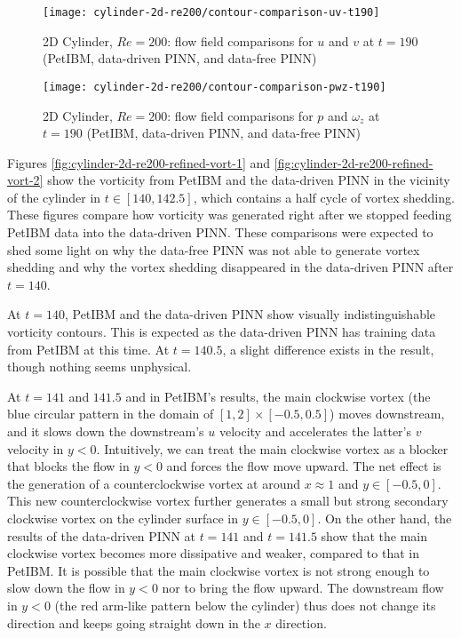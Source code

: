 \begin{figure}[hbt!]
    \texttt{[image: cylinder-2d-re200/contour-comparison-uv-t190]}
    \caption{2D Cylinder, $Re=200$: flow field comparisons for $u$ and $v$ at $t=190$ (PetIBM, data-driven PINN, and data-free PINN)}
    \label{fig:cylinder-re200-contour-uv-t190}
\end{figure}

\begin{figure}[hbt!]
    \texttt{[image: cylinder-2d-re200/contour-comparison-pwz-t190]}
    \caption{2D Cylinder, $Re=200$: flow field comparisons for $p$ and $\omega_z$ at $t=190$ (PetIBM, data-driven PINN, and data-free PINN)}
    \label{fig:cylinder-re200-contour-pwz-t190}
\end{figure}

\clearpage

Figures \ref{fig:cylinder-2d-re200-refined-vort-1} and \ref{fig:cylinder-2d-re200-refined-vort-2} show the vorticity from PetIBM and the data-driven PINN in the vicinity of the cylinder in $t \in [140, 142.5]$, which contains a half cycle of vortex shedding.
These figures compare how vorticity was generated right after we stopped feeding PetIBM data into the data-driven PINN.
These comparisons were expected to shed some light on why the data-free PINN was not able to generate vortex shedding and why the vortex shedding disappeared in the data-driven PINN after $t=140$.

At $t=140$, PetIBM and the data-driven PINN show visually indistinguishable vorticity contours.
This is expected as the data-driven PINN has training data from PetIBM at this time.
At $t=140.5$, a slight difference exists in the result, though nothing seems unphysical.

At $t=141$ and $141.5$ and in PetIBM's results, the main clockwise vortex (the blue circular pattern in the domain of $[1, 2]\times[-0.5, 0.5]$) moves downstream, and it slows down the downstream's $u$ velocity and accelerates the latter's $v$ velocity in $y<0$.
Intuitively, we can treat the main clockwise vortex as a blocker that blocks the flow in $y<0$ and forces the flow move upward.
The net effect is the generation of a counterclockwise vortex at around $x\approx 1$ and $y \in [-0.5, 0]$.
This new counterclockwise vortex further generates a small but strong secondary clockwise vortex on the cylinder surface in $y\in[-0.5, 0]$.
On the other hand, the results of the data-driven PINN at $t=141$ and $t=141.5$ show that the main clockwise vortex becomes more dissipative and weaker, compared to that in PetIBM.
It is possible that the main clockwise vortex is not strong enough to slow down the flow in $y<0$ nor to bring the flow upward.
The downstream flow in $y<0$ (the red arm-like pattern below the cylinder) thus does not change its direction and keeps going straight down in the $x$ direction.

